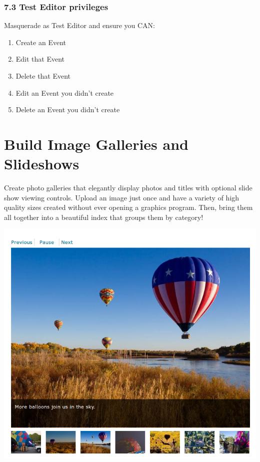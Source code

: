 \documentclass[letterpaper,10pt,english]{sphinxmanual}
\begin{document}
\subsection{7.3 Test Editor privileges}
\label{event_calendar:test-editor-privileges}
Masquerade as Test Editor and ensure you CAN:
\begin{enumerate}
\item {} 
Create an Event

\item {} 
Edit that Event

\item {} 
Delete that Event

\item {} 
Edit an Event you didn’t create

\item {} 
Delete an Event you didn’t create

\end{enumerate}


\chapter{Build Image Galleries and Slideshows}
\label{slides:build-image-galleries-and-slideshows}\label{slides::doc}
Create photo galleries that elegantly display photos and titles with optional slide show viewing controls. Upload an image just once and have a variety of high quality sizes created without ever opening a graphics program. Then, bring them all together into a beautiful index that groups them by category!

\includegraphics{balloons.png}
\end{document}
